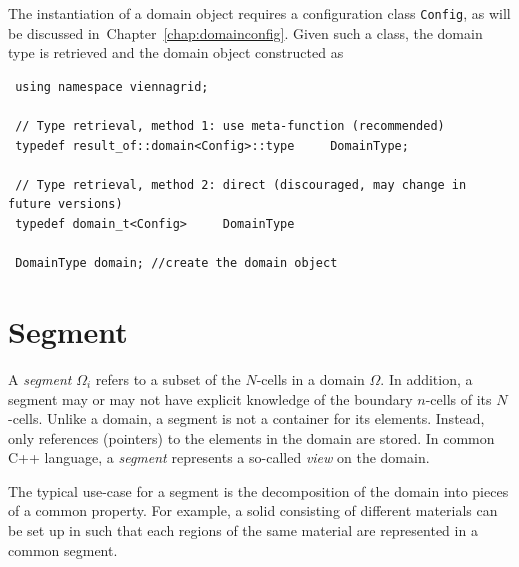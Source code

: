 The instantiation of a {\ViennaGrid} domain object requires a configuration class \lstinline|Config|, as will be discussed in~Chapter~\ref{chap:domainconfig}. Given such a class, the domain type is retrieved and the domain object constructed as 
\begin{lstlisting}
 using namespace viennagrid;

 // Type retrieval, method 1: use meta-function (recommended)
 typedef result_of::domain<Config>::type     DomainType;

 // Type retrieval, method 2: direct (discouraged, may change in future versions)
 typedef domain_t<Config>     DomainType

 DomainType domain; //create the domain object
\end{lstlisting}


\section{Segment}
A \emph{segment} $\Omega_i$ refers to a subset of the $N$-cells in a domain $\Omega$. In addition, a segment may or may not have explicit knowledge of the boundary $n$-cells of its $N$-cells. Unlike a domain, a segment is not a container for its elements. Instead, only references (pointers) to the elements in the domain are stored. In common C++ language, a \emph{segment} represents a so-called \emph{view} on the domain.

The typical use-case for a segment is the decomposition of the domain into pieces of a common property. For example, a solid consisting of different materials can be set up in {\ViennaGrid} such that each regions of the same material are represented in a common segment.


